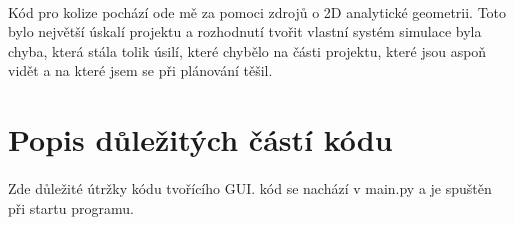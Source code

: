 \documentclass[12pt,a4paper]{report}
\begin{document}
\paragraph{} Kód pro kolize pochází ode mě za pomoci zdrojů o 2D analytické geometrii. Toto bylo největší úskalí projektu a rozhodnutí tvořit vlastní systém simulace byla chyba, která stála tolik úsilí, které chybělo na části projektu, které jsou aspoň vidět a na které jsem se při plánování těšil.

\section{Popis důležitých částí kódu}
\paragraph{} Zde důležité útržky kódu tvořícího GUI. kód se nachází v main.py a je spuštěn při startu programu.
\end{document}
